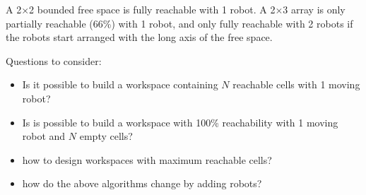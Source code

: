 \documentclass[letterpaper, 10 pt, conference]{ieeeconf}
\begin{document}
A 2$\times$2 bounded free space is fully reachable with 1 robot.  A 2$\times$3 array is only partially reachable (66\%) with 1 robot, and only fully reachable with 2 robots if the robots start arranged with the long axis of the free space.

Questions to consider:
\begin{itemize}
\item  Is it possible to build a workspace containing $N$ reachable cells with 1 moving robot?
\item Is is possible to build a workspace with 100\% reachability with 1 moving robot and $N$ empty cells?
\item how to design workspaces with maximum reachable cells?
\item how do the above algorithms change by adding robots?
\end{itemize}




    
    
   

%
\end{document}
